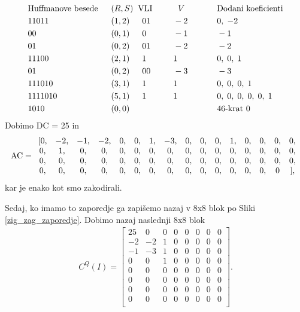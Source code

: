 \documentclass[a4paper,12pt,openright]{book}
\begin{document}
\begin{alignat*}{5}
&\hbox{Huffmanove besede}\;\; && (R,S)\;\; \hbox{VLI}&&\indent\;\;  V&&\indent && \hbox{Dodani koeficienti}\\
    &11011   &&(1,2)\indent01&&\indent -2&&\indent &&0,\;-2            \\
    &00      &&(0,1)\indent 0&&\indent -1&&\indent &&-1               \\
    &01      &&(0,2)\indent01&&\indent -2&&\indent &&-2               \\
    &11100   &&(2,1)\indent 1&&\indent  1&&\indent &&0,\;0,\;1          \\
    &01      &&(0,2)\indent00&&\indent -3&&\indent &&-3               \\
    &111010  &&(3,1)\indent 1&&\indent  1&&\indent &&0,\;0,\;0,\;1       \\
    &1111010 &&(5,1)\indent 1&&\indent  1&&\indent &&0,\;0,\;0,\;0,\;0,\;1 \\
    &1010    &&(0,0)\indent  &&\indent   &&\indent &&46\hbox{-krat } 0
\end{alignat*}
Dobimo DC =  25 in
\begin{gather*}
 \hbox{AC} =
  \begin{array}{*{16}c}
    [0,& -2,& -1,& -2,& 0,& 0,& 1,& -3,& 0,& 0,& 0,& 1,& 0,& 0,& 0,& 0,\\
     0,&  1,&  0,&  0,& 0,& 0,& 0,&  0,& 0,& 0,& 0,& 0,& 0,& 0,& 0,& 0,\\
     0,&  0,&  0,&  0,& 0,& 0,& 0,&  0,& 0,& 0,& 0,& 0,& 0,& 0,& 0,& 0,\\
     0,&  0,&  0,&  0,& 0,& 0,& 0,&  0,& 0,& 0,& 0,& 0,& 0,& 0,& 0 & ],\\
  \end{array}
\end{gather*}
kar je enako kot smo zakodirali.\par
Sedaj, ko imamo to zaporedje ga zapišemo nazaj v 8x8 blok po Sliki \ref{zig_zag_zaporedje}. Dobimo nazaj naslednji 8x8 blok
\begin{gather*}
 C^Q(I) =
  \begin{bmatrix}
 25&  0&  0&  0&  0&  0&  0&  0\\
 -2& -2&  1&  0&  0&  0&  0&  0\\
 -1& -3&  1&  0&  0&  0&  0&  0\\
  0&  0&  1&  0&  0&  0&  0&  0\\
  0&  0&  0&  0&  0&  0&  0&  0\\
  0&  0&  0&  0&  0&  0&  0&  0\\
  0&  0&  0&  0&  0&  0&  0&  0\\
  0&  0&  0&  0&  0&  0&  0&  0\\
   \end{bmatrix}.
\end{gather*}
\end{document}
